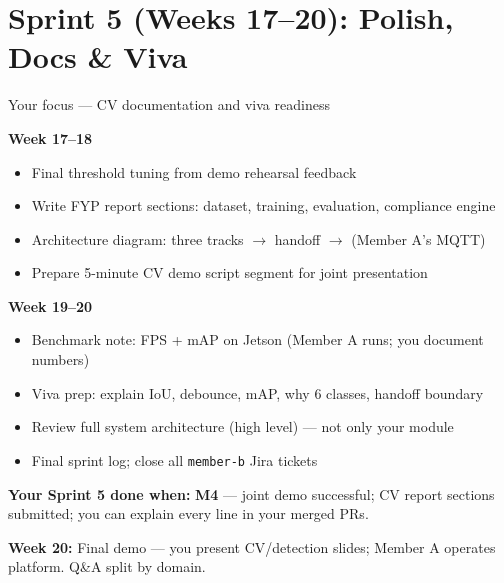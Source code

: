 \documentclass[12pt,a4paper]{article}
\begin{document}
\section{Sprint 5 (Weeks 17--20): Polish, Docs \& Viva}

\begin{sprintbox}{Your focus --- CV documentation and viva readiness}

\begin{taskbox}
\textbf{Week 17--18}
\begin{itemize}
    \item Final threshold tuning from demo rehearsal feedback
    \item Write FYP report sections: dataset, training, evaluation, compliance engine
    \item Architecture diagram: three tracks $\rightarrow$ handoff $\rightarrow$ (Member A's MQTT)
    \item Prepare 5-minute CV demo script segment for joint presentation
\end{itemize}
\end{taskbox}

\begin{taskbox}
\textbf{Week 19--20}
\begin{itemize}
    \item Benchmark note: FPS + mAP on Jetson (Member A runs; you document numbers)
    \item Viva prep: explain IoU, debounce, mAP, why 6 classes, handoff boundary
    \item Review full system architecture (high level) --- not only your module
    \item Final sprint log; close all \texttt{member-b} Jira tickets
\end{itemize}
\end{taskbox}

\begin{deliverablebox}
\textbf{Your Sprint 5 done when:} \textbf{M4} --- joint demo successful; CV report sections submitted; you can explain every line in your merged PRs.
\end{deliverablebox}

\begin{collabbox}
\textbf{Week 20:} Final demo --- you present CV/detection slides; Member A operates platform. Q\&A split by domain.
\end{collabbox}

\end{sprintbox}
\end{document}
